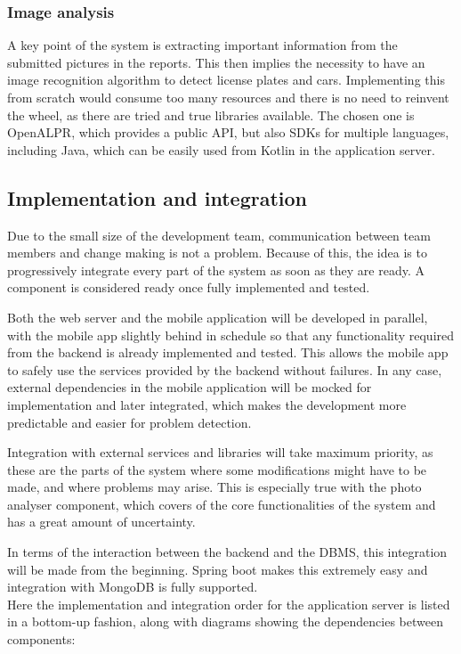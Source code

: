 \subsubsection{Image analysis}
A key point of the system is extracting important information from the submitted pictures in the reports. This then implies the necessity to have an image recognition algorithm to detect license plates and cars. Implementing this from scratch would consume too many resources and there is no need to reinvent the wheel, as there are tried and true libraries available. The chosen one is OpenALPR, which provides a public API, but also SDKs for multiple languages, including Java, which can be easily used from Kotlin in the application server.


\subsection{Implementation and integration}
Due to the small size of the development team, communication between team members and change making is not a problem. Because of this, the idea is to progressively integrate every part of the system as soon as they are ready. A component is considered ready once fully implemented and tested.

Both the web server and the mobile application will be developed in parallel, with the mobile app slightly behind in schedule so that any functionality required from the backend is already implemented and tested. This allows the mobile app to safely use the services provided by the backend without failures. In any case, external dependencies in the mobile application will be mocked for implementation and later integrated, which makes the development more predictable and easier for problem detection.

Integration with external services and libraries will take maximum priority, as these are the parts of the system where some modifications might have to be made, and where problems may arise. This is especially true with the photo analyser component, which covers of the core functionalities of the system and has a great amount of uncertainty. 

In terms of the interaction between the backend and the DBMS, this integration will be made from the beginning. Spring boot makes this extremely easy and integration with MongoDB is fully supported.\\

Here the implementation and integration order for the application server is listed in a bottom-up fashion, along with diagrams showing the dependencies between components:\\

